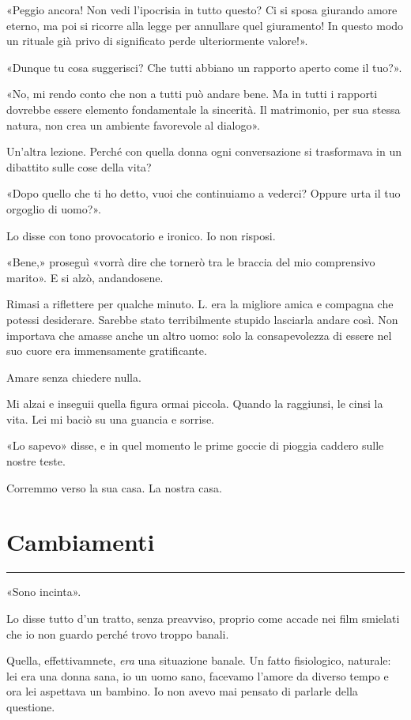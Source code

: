 \documentclass[a4paper,11pt,oneside,openright,final]{memoir}
\begin{document}
«Peggio ancora! Non vedi l'ipocrisia in tutto questo? Ci si sposa giurando amore
eterno, ma poi si ricorre alla legge per annullare quel giuramento! In questo
modo un rituale già privo di significato perde ulteriormente valore!».

«Dunque tu cosa suggerisci? Che tutti abbiano un rapporto aperto come il tuo?».

«No, mi rendo conto che non a tutti può andare bene. Ma in tutti i rapporti
dovrebbe essere elemento fondamentale la sincerità. Il matrimonio, per sua
stessa natura, non crea un ambiente favorevole al dialogo».

Un'altra lezione. Perché con quella donna ogni conversazione si trasformava in
un dibattito sulle cose della vita?

«Dopo quello che ti ho detto, vuoi che continuiamo a vederci? Oppure urta il tuo
orgoglio di uomo?».

Lo disse con tono provocatorio e ironico. Io non risposi.

«Bene,» proseguì «vorrà dire che tornerò tra le braccia del mio comprensivo
marito». E si alzò, andandosene.

Rimasi a riflettere per qualche minuto. L. era la migliore amica e compagna che
potessi desiderare. Sarebbe stato terribilmente stupido lasciarla andare così.
Non importava che amasse anche un altro uomo: solo la consapevolezza di essere
nel suo cuore era immensamente gratificante.

Amare senza chiedere nulla.

Mi alzai e inseguii quella figura ormai piccola. Quando la raggiunsi, le cinsi
la vita. Lei mi baciò su una guancia e sorrise.

«Lo sapevo» disse, e in quel momento le prime goccie di pioggia caddero sulle
nostre teste.

Corremmo verso la sua casa. La nostra casa.

\chapter{Cambiamenti}

\plainbreak{1}

«Sono incinta».

Lo disse tutto d'un tratto, senza preavviso, proprio come accade nei film
smielati che io non guardo perché trovo troppo banali.

Quella, effettivamnete, \emph{era} una situazione banale. Un fatto fisiologico,
naturale: lei era una donna sana, io un uomo sano, facevamo l'amore da
diverso tempo e ora lei aspettava un bambino. Io non avevo mai pensato di
parlarle della questione.
\end{document}
